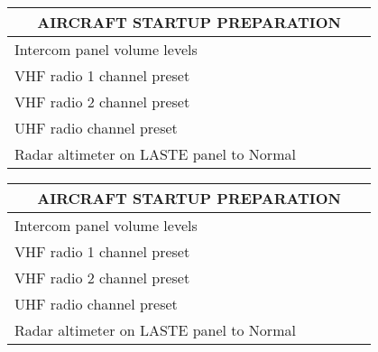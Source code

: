 \documentclass[10pt, twocolumn]{article}
\newenvironment{checklist}[1]{%
  \renewcommand{\item}[2]{%
    ##1\hspace{2em}\dotfill\makebox{\uppercase{##2}}\\
  }
  \newcommand{\step}[1]{%
    \hspace*{10em}-\hspace*{\labelsep}##1\\
  }
  \begin{tabular}{p{0.8\linewidth}}
     \toprule
       \multicolumn{1}{c}{\textbf{\uppercase{#1}}}\\
     \midrule
}{\bottomrule\end{tabular}\vspace{1em}}
\begin{document}
\begin{checklist}{Aircraft Startup Preparation}
  \item{Intercom panel volume levels}{set knobs as needed}
  \item{VHF radio 1 channel preset}{Check preset}
  \item{VHF radio 2 channel preset}{Check preset}
  \item{UHF radio channel preset}{Check preset}
  \item{Radar altimeter on LASTE panel to Normal}{Set to NRM}
\end{checklist}

\begin{checklist}{Aircraft Startup Preparation}
  \item{Intercom panel volume levels}{set knobs as needed}
  \item{VHF radio 1 channel preset}{Check preset}
  \item{VHF radio 2 channel preset}{Check preset}
  \item{UHF radio channel preset}{Check preset}
  \item{Radar altimeter on LASTE panel to Normal}{Set to NRM}
\end{checklist}
\end{document}
